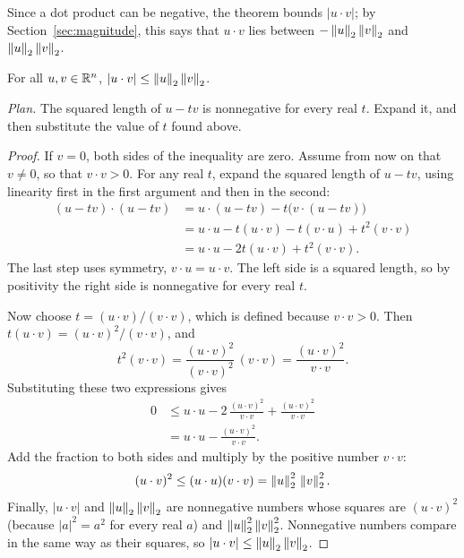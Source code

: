 Since a dot product can be negative, the theorem bounds $|u\cdot v|$; by Section~\ref{sec:magnitude}, this says that $u\cdot v$ lies between $-\left\|u\right\|_2\left\|v\right\|_2$ and $\left\|u\right\|_2\left\|v\right\|_2$.

\par\noindent\begin{minipage}{\linewidth}
\begin{theorem}\label{thm:cs}
For all $u,v\in\mathbb R^n$, $|u\cdot v|\le\left\|u\right\|_2\left\|v\right\|_2$.
\end{theorem}
\end{minipage}\par

\noindent\textit{Plan.} The squared length of $u-tv$ is nonnegative for every real $t$. Expand it, and then substitute the value of $t$ found above.
\begin{proof}
If $v=0$, both sides of the inequality are zero. Assume from now on that $v\ne0$, so that $v\cdot v>0$. For any real $t$, expand the squared length of $u-tv$, using linearity first in the first argument and then in the second:
\begin{align*}
 (u-tv)\cdot(u-tv)
 &=u\cdot(u-tv)-t\bigl(v\cdot(u-tv)\bigr)\\
 &=u\cdot u-t(u\cdot v)-t(v\cdot u)+t^2(v\cdot v)\\
 &=u\cdot u-2t(u\cdot v)+t^2(v\cdot v).
\end{align*}
The last step uses symmetry, $v\cdot u=u\cdot v$. The left side is a squared length, so by positivity the right side is nonnegative for every real $t$.

Now choose $t=(u\cdot v)/(v\cdot v)$, which is defined because $v\cdot v>0$. Then $t(u\cdot v)=(u\cdot v)^2/(v\cdot v)$, and
\[
t^2(v\cdot v)=\frac{(u\cdot v)^2}{(v\cdot v)^2}\,(v\cdot v)=\frac{(u\cdot v)^2}{v\cdot v}.
\]
Substituting these two expressions gives
\begin{align*}
0&\le u\cdot u-2\,\frac{(u\cdot v)^2}{v\cdot v}+\frac{(u\cdot v)^2}{v\cdot v}\\
&=u\cdot u-\frac{(u\cdot v)^2}{v\cdot v}.
\end{align*}
Add the fraction to both sides and multiply by the positive number $v\cdot v$:
\[
(u\cdot v)^2\le(u\cdot u)(v\cdot v)=\left\|u\right\|_2^2\,\left\|v\right\|_2^2.
\]
Finally, $|u\cdot v|$ and $\left\|u\right\|_2\left\|v\right\|_2$ are nonnegative numbers whose squares are $(u\cdot v)^2$ (because $|a|^2=a^2$ for every real $a$) and $\left\|u\right\|_2^2\left\|v\right\|_2^2$. Nonnegative numbers compare in the same way as their squares, so $|u\cdot v|\le\left\|u\right\|_2\left\|v\right\|_2$.
\end{proof}

